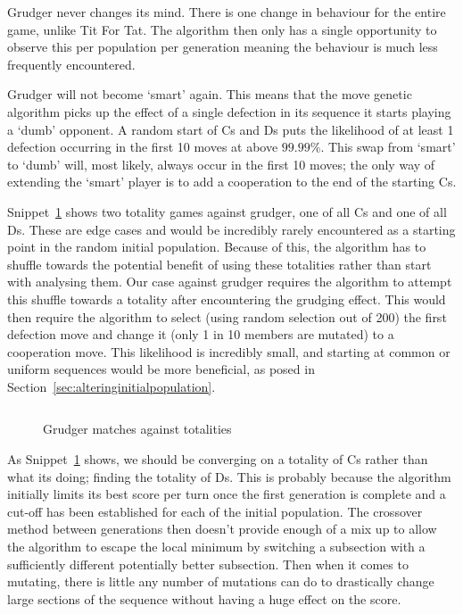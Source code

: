 \begin{itemize}
    \begin{item}
        Grudger never changes its mind.
        There is one change in behaviour for the entire game, unlike Tit For Tat.
        The algorithm then only has a single opportunity to observe this per population per generation meaning the behaviour is much less frequently encountered.
    \end{item}
    \begin{item}
        Grudger will not become `smart' again.
        This means that the move genetic algorithm picks up the effect of a single defection in its sequence it starts playing a `dumb' opponent.
        A random start of Cs and Ds puts the likelihood of at least 1 defection occurring in the first 10 moves at above \(99.99\% \).
        This swap from `smart' to `dumb' will, most likely, always occur in the first 10 moves;
        the only way of extending the `smart' player is to add a cooperation to the end of the starting Cs.
    \end{item}
\end{itemize}

Snippet~\ref{code:gudgerTotalities} shows two totality games against grudger, one of all Cs and one of all Ds.
These are edge cases and would be incredibly rarely encountered as a starting point in the random initial population.
Because of this, the algorithm has to shuffle towards the potential benefit of using these totalities rather than start with analysing them.
Our case against grudger requires the algorithm to attempt this shuffle towards a totality after encountering the grudging effect.
This would then require the algorithm to select (using random selection out of 200) the first defection move and change it (only 1 in 10 members are mutated) to a cooperation move.
This likelihood is incredibly small, and starting at common or uniform sequences would be more beneficial, as posed in Section~\ref{sec:alteringinitialpopulation}.

\begin{figure}
    \inputminted{python}{code_snippets/grudgerTotalities.py}
    \caption{Grudger matches against totalities}\label{code:gudgerTotalities}
\end{figure}

As Snippet~\ref{code:gudgerTotalities} shows, we should be converging on a totality of Cs rather than what its doing;
finding the totality of Ds.
This is probably because the algorithm initially limits its best score per turn once the first generation is complete and a cut-off has been established for each of the initial population.
The crossover method between generations then doesn't provide enough of a mix up to allow the algorithm to escape the local minimum by switching a subsection with a sufficiently different potentially better subsection.
Then when it comes to mutating, there is little any number of mutations can do to drastically change large sections of the sequence without having a huge effect on the score.

